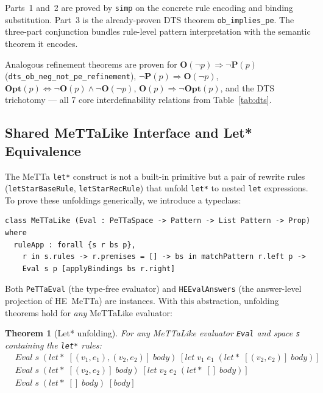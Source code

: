 \documentclass[]{article}
\newtheorem{theorem}{Theorem}
\newcommand{\code}[1]{\texttt{#1}}
\newcommand{\OB}{\ensuremath{\mathbf{O}}}
\newcommand{\PE}{\ensuremath{\mathbf{P}}}
\newcommand{\OP}{\ensuremath{\mathbf{Opt}}}
\newcommand{\DTS}{\textup{DTS}}
\begin{document}
\noindent
Parts~1 and~2 are proved by \code{simp} on the concrete rule encoding and
binding substitution.  Part~3 is the already-proven \DTS{} theorem
\code{ob\_implies\_pe}.  The three-part conjunction bundles rule-level
pattern interpretation with the semantic theorem it encodes.

Analogous refinement theorems are proven for $\OB(\neg p) \Rightarrow \neg\PE(p)$
(\code{dts\_ob\_neg\_not\_pe\_refinement}), $\neg\PE(p) \Rightarrow \OB(\neg p)$,
$\OP(p) \Leftrightarrow \neg\OB(p) \wedge \neg\OB(\neg p)$,
$\OB(p) \Rightarrow \neg\OP(p)$, and the \DTS{} trichotomy --- all 7 core
interdefinability relations from Table~\ref{tab:dts}.

\subsection{Shared MeTTaLike Interface and Let* Equivalence}

The MeTTa \code{let*} construct is not a built-in primitive but a pair of
rewrite rules (\code{letStarBaseRule}, \code{letStarRecRule}) that unfold
\code{let*} to nested \code{let} expressions.  To prove these unfoldings
generically, we introduce a typeclass:

\begin{lstlisting}
class MeTTaLike (Eval : PeTTaSpace -> Pattern -> List Pattern -> Prop) where
  ruleApp : forall {s r bs p},
    r in s.rules -> r.premises = [] -> bs in matchPattern r.left p ->
    Eval s p [applyBindings bs r.right]
\end{lstlisting}

\noindent
Both \code{PeTTaEval} (the type-free evaluator) and \code{HEEvalAnswers}
(the answer-level projection of HE~MeTTa) are instances.
With this abstraction, unfolding theorems hold for \emph{any} MeTTaLike evaluator:

\begin{theorem}[Let* unfolding]
For any MeTTaLike evaluator \code{Eval} and space \code{s} containing the
\code{let*} rules:
\begin{align*}
  &\mathit{Eval}\;s\;(\mathit{let*}\;[(v_1, e_1), (v_2, e_2)]\;\mathit{body})
    \;[\mathit{let}\;v_1\;e_1\;(\mathit{let*}\;[(v_2, e_2)]\;\mathit{body})] \\
  &\mathit{Eval}\;s\;(\mathit{let*}\;[(v_2, e_2)]\;\mathit{body})
    \;[\mathit{let}\;v_2\;e_2\;(\mathit{let*}\;[]\;\mathit{body})] \\
  &\mathit{Eval}\;s\;(\mathit{let*}\;[]\;\mathit{body})\;[\mathit{body}]
\end{align*}
\end{theorem}
\end{document}
